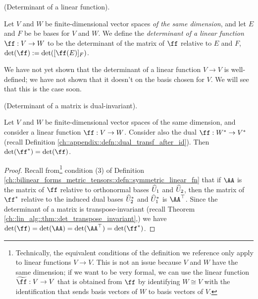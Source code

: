 

\begin{defn}
    (Determinant of a linear function).
    
    Let $V$ and $W$ be finite-dimensional vector spaces \textit{of the same dimension}, and let $E$ and $F$ be be bases for $V$ and $W$. We define the \textit{determinant of a linear function $\ff:V \rightarrow W$} to be the determinant of the matrix of $\ff$ relative to $E$ and $F$, $\det(\ff) := \det([\ff(E)]_F)$.
\end{defn}

\begin{remark}
    We have not yet shown that the determinant of a linear function $V \rightarrow V$ is well-defined; we have not shown that it doesn't on the basis chosen for $V$. We will see that this is the case soon.
\end{remark}

\begin{theorem}
\label{ch::lin_alg::rmk::det_dual_invariant}
    (Determinant of a matrix is dual-invariant).
    
    Let $V$ and $W$ be finite-dimensional vector spaces of the same dimension, and consider a linear function $\ff:V \rightarrow W$. Consider also the dual $\ff:W^* \rightarrow V^*$ (recall Definition \ref{ch::appendix::defn::dual_transf_after_id}). Then $\det(\ff^*) = \det(\ff)$.
\end{theorem}

\begin{proof}
    Recall from\footnote{Technically, the equivalent conditions of the definition we reference only apply to linear functions $V \rightarrow V$. This is not an issue because $V$ and $W$ have the same dimension; if we want to be very formal, we can use the linear function $\widetilde{\ff}:V \rightarrow V$ that is obtained from $\ff$ by identifying $W \cong V$ with the identification that sends basis vectors of $W$ to basis vectors of $V$.} condition (3) of Definition \ref{ch::bilinear_forms_metric_tensors::defn::symmetric_linear_fn} that if $\AA$ is the matrix of $\ff$ relative to orthonormal bases $\widehat{U}_1$ and $\widehat{U}_2$, then the matrix of $\ff^*$ relative to the induced dual bases $\widehat{U}_2^*$ and $\widehat{U}_1^*$ is $\AA^\top$. Since the determinant of a matrix is transpose-invariant (recall Theorem \ref{ch::lin_alg::thm::det_transpose_invariant},) we have $\det(\ff) = \det(\AA) = \det(\AA^\top) = \det(\ff^*)$.
\end{proof}

